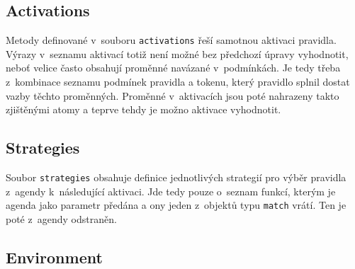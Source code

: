 \subsection{Activations}
Metody definované v~souboru \verb|activations| řeší samotnou aktivaci pravidla.
Výrazy v~seznamu aktivací totiž není možné bez předchozí úpravy vyhodnotit,
neboť velice často obsahují proměnné navázané v~podmínkách. Je tedy třeba
z~kombinace seznamu podmínek pravidla a tokenu, který pravidlo splnil dostat
vazby těchto proměnných. Proměnné v~aktivacích jsou poté nahrazeny takto
zjištěnými atomy a teprve tehdy je možno aktivace vyhodnotit.
\subsection{Strategies}
Soubor \verb|strategies| obsahuje definice jednotlivých strategií pro výběr
pravidla z~agendy k~následující aktivaci. Jde tedy pouze o~seznam funkcí,
kterým je agenda jako parametr předána a ony jeden z~objektů typu \verb|match|
vrátí. Ten je poté z~agendy odstraněn.
\subsection{Environment}

